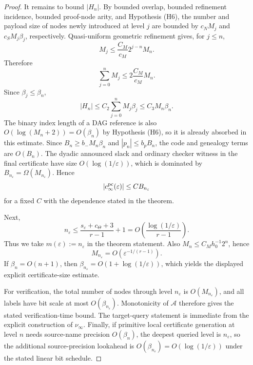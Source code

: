 \documentclass[11pt]{article}
\theoremstyle{definition}
\begin{document}
\begin{proof}
It remains to bound $|H_n|$.  By bounded overlap, bounded refinement incidence, bounded
proof-node arity, and Hypothesis (H6), the number and payload size of nodes newly introduced
at level $j$ are bounded by $c_NM_j$ and $c_SM_j\beta_j$, respectively.  Quasi-uniform
geometric refinement gives, for $j\le n$,
\[
 M_j\le\frac{C_M}{c_M}2^{j-n}M_n.
\]
Therefore
\[
 \sum_{j=0}^n M_j
 \le 2\frac{C_M}{c_M}M_n.
\]
Since $\beta_j\le\beta_n$,
\[
 |H_n|
 \le C_2\sum_{j=0}^nM_j\beta_j
 \le C_3M_n\beta_n.
\]
The binary index length of a DAG reference is also $O(\log(M_n+2))=O(\beta_n)$ by
Hypothesis (H6), so it is already absorbed in this estimate.  Since $B_n\ge b_-M_n\beta_n$ and $|p_n|\le b_pB_n$, the code and genealogy
terms are $O(B_n)$.  The dyadic announced slack and ordinary checker witness in the final certificate have
size $O(\log(1/\varepsilon))$, which is dominated by
$B_{n_\varepsilon}=\Omega(M_{n_\varepsilon})$.  Hence
\[
 |c_\infty^{\rm pc}(\varepsilon)|
 \le C B_{n_\varepsilon}
\]
for a fixed $C$ with the dependence stated in the theorem.

Next,
\[
 n_\varepsilon
 \le\frac{s_\varepsilon+c_\Theta+3}{r-1}+1
 =O\!\left(\frac{\log(1/\varepsilon)}{r-1}\right).
\]
Thus we take $m(\varepsilon):=n_\varepsilon$ in the theorem statement.  Also $M_n\le C_Mh_0^{-1}2^n$, hence
\[
 M_{n_\varepsilon}
 =O\!\left(\varepsilon^{-1/(r-1)}\right).
\]
If $\beta_n=O(n+1)$, then
$\beta_{n_\varepsilon}=O(1+\log(1/\varepsilon))$, which yields the displayed explicit
certificate-size estimate.

For verification, the total number of nodes through level $n_\varepsilon$ is
$O(M_{n_\varepsilon})$, and all labels have bit scale at most
$O(\beta_{n_\varepsilon})$.  Monotonicity of $\mathcal A$ therefore gives the stated
verification-time bound.  The target-query statement is immediate from the explicit
construction of $\nu_\infty$.  Finally, if primitive local certificate generation at level
$n$ needs source-name precision $O(\beta_n)$, the deepest queried level is
$n_\varepsilon$, so the additional source-precision lookahead is
$O(\beta_{n_\varepsilon})=O(\log(1/\varepsilon))$ under the stated linear bit schedule.
\end{proof}
\end{document}
